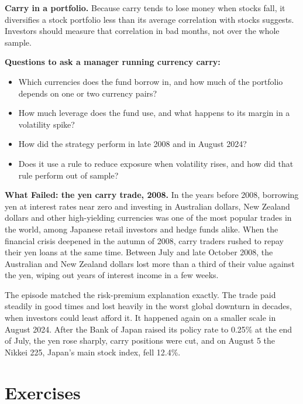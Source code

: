 \textbf{Carry in a portfolio.} Because carry tends to lose money when stocks fall, it diversifies a stock portfolio less than its average correlation with stocks suggests. Investors should measure that correlation in bad months, not over the whole sample.

\textbf{Questions to ask a manager running currency carry:}

\begin{itemize}
  \item Which currencies does the fund borrow in, and how much of the portfolio depends on one or two currency pairs?
  \item How much leverage does the fund use, and what happens to its margin in a volatility spike?
  \item How did the strategy perform in late 2008 and in August 2024?
  \item Does it use a rule to reduce exposure when volatility rises, and how did that rule perform out of sample?
\end{itemize}

\begin{callout}
\textbf{What Failed: the yen carry trade, 2008.} In the years before 2008, borrowing yen at interest rates near zero and investing in Australian dollars, New Zealand dollars and other high-yielding currencies was one of the most popular trades in the world, among Japanese retail investors and hedge funds alike. When the financial crisis deepened in the autumn of 2008, carry traders rushed to repay their yen loans at the same time. Between July and late October 2008, the Australian and New Zealand dollars lost more than a third of their value against the yen, wiping out years of interest income in a few weeks.

The episode matched the risk-premium explanation exactly. The trade paid steadily in good times and lost heavily in the worst global downturn in decades, when investors could least afford it. It happened again on a smaller scale in August 2024. After the Bank of Japan raised its policy rate to 0.25\% at the end of July, the yen rose sharply, carry positions were cut, and on August 5 the Nikkei 225, Japan's main stock index, fell 12.4\%.
\end{callout}

\section*{Exercises}

